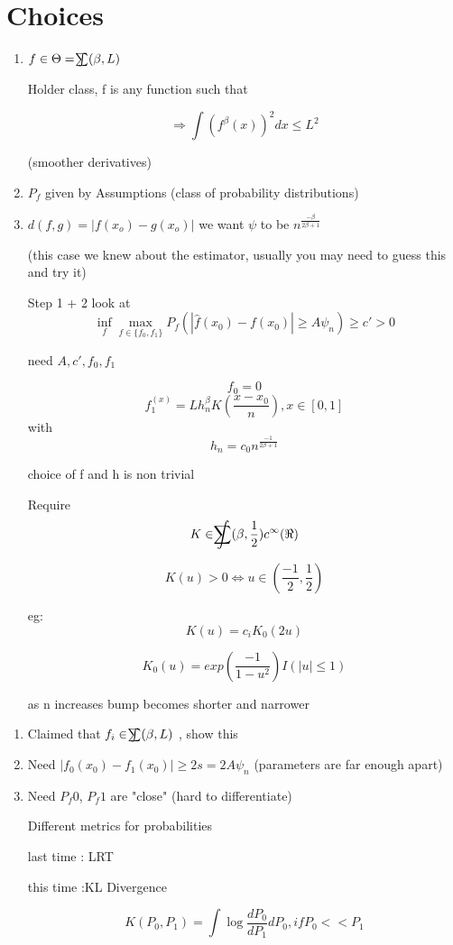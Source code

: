 \documentclass[10pt]{article}
\renewcommand{\hat}{\widehat}
\begin{document}
\section{Choices}
\begin{enumerate}

\item $f \in \Theta = \int\mathllap{\sum} (\beta,L) $

Holder class, f is any function such that

$$ \Rightarrow \int (f^{\beta} (x))^2 dx \leq L^2$$

(smoother derivatives)

\item $P_f$ given by Assumptions
(class of probability distributions)

\item $d(f,g) = |f(x_o) - g(x_o)|$
we want $\psi$ to be $n^\frac{-\beta}{2\beta + 1}$

(this case we knew about the estimator, usually you may need to guess this and try it)

Step 1 + 2 look at 
$$\inf_{f} \max_{f \in \{f_0,f_1\}} P_f(|\hat f(x_0) - f(x_0)| \geq A \psi_n) \geq c' > 0$$

need $A, c', f_0, f_1$

$$f_0 = 0$$
$$f_1^{(x)} = Lh^\beta_nK(\frac{x-x_0}{n}), x\in [0,1]$$
with $$h_n = c_0n^{\frac{-1}{2\beta + 1}}$$

choice of f and h is non trivial

Require $$K \in \int\mathllap{\sum} (\beta,\frac{1}{2}) c^\infty(\Re)$$

$$K(u) > 0 \iff u \in (\frac{-1}{2}, \frac{1}{2})$$

eg: $$K(u) = c_iK_0(2u)$$

$$K_0(u) = exp(\frac{-1}{1 - u^2})I(|u| \leq 1)$$

as n increases bump becomes shorter and narrower
\end{enumerate}

\begin{enumerate}
\item Claimed that $f_i \in \int\mathllap{\sum} (\beta, L)$ , show this
\item Need $|f_0(x_0) - f_1(x_0)| \geq 2s = 2A\psi_n$
(parameters are  far enough apart)
\item Need $P_f0$, $P_f1$ are "close" (hard to differentiate)

Different metrics for probabilities

last time : LRT 

this time :KL Divergence

$$K(P_0, P_1) = \int \log\frac{dP_0}{dP_1} dP_0, if P_0 << P_1$$
\end{enumerate}
\end{document}
